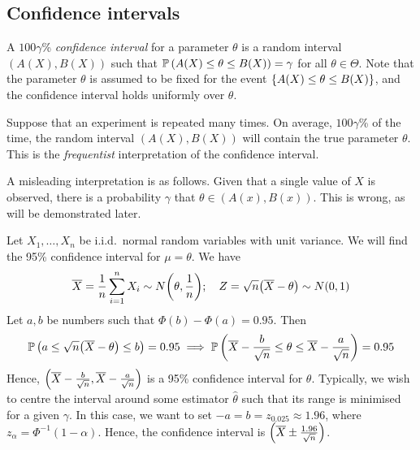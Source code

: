 \subsection{Confidence intervals}
\begin{definition}
	A \( 100 \gamma \)\% \textit{confidence interval} for a parameter \( \theta \) is a random interval \( (A(X), B(X)) \) such that \( \mathbb{P}\left({A(X) \leq \theta \leq B(X)}\right) = \gamma \) for all \( \theta \in \Theta \).
	Note that the parameter \( \theta \) is assumed to be fixed for the event \( \qty{A(X) \leq \theta \leq B(X)} \), and the confidence interval holds uniformly over \( \theta \).
\end{definition}
\begin{remark}
	Suppose that an experiment is repeated many times.
	On average, \( 100 \gamma \)\% of the time, the random interval \( (A(X), B(X)) \) will contain the true parameter \( \theta \).
	This is the \textit{frequentist} interpretation of the confidence interval.

	A misleading interpretation is as follows.
	Given that a single value of \( X \) is observed, there is a probability \( \gamma \) that \( \theta \in (A(x), B(x)) \).
	This is wrong, as will be demonstrated later.
\end{remark}
\begin{example}
	Let \( X_1, \dots, X_n \) be i.i.d.\ normal random variables with unit variance.
	We will find the 95\% confidence interval for \( \mu = \theta \).
	We have
	\[
		\overline X = \frac{1}{n} \sum_{i=1}^n X_i \sim N\qty(\theta, \frac{1}{n});\quad Z = \sqrt{n}\qty(\overline X - \theta) \sim N(0,1)
	\]
	Let \( a, b \) be numbers such that \( \Phi(b) - \Phi(a) = 0.95 \).
	Then
	\[
		\mathbb{P}\left({a \leq \sqrt{n} \qty(\overline X - \theta) \leq b}\right) = 0.95 \implies \mathbb{P}\left({\overline X - \frac{b}{\sqrt{n}} \leq \theta \leq \overline X - \frac{a}{\sqrt{n}}}\right) = 0.95
	\]
	Hence, \( \qty(\overline X - \frac{b}{\sqrt{n}}, \overline X - \frac{a}{\sqrt{n}}) \) is a 95\% confidence interval for \( \theta \).
	Typically, we wish to centre the interval around some estimator \( \hat\theta \) such that its range is minimised for a given \( \gamma \).
	In this case, we want to set \( -a = b = z_{0.025} \approx 1.96 \), where \( z_\alpha = \Phi^{-1}(1-\alpha) \).
	Hence, the confidence interval is \( \qty(\overline X \pm \frac{1.96}{\sqrt{n}}) \).
\end{example}
